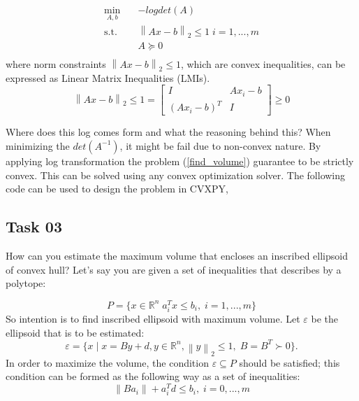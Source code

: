 \documentclass[12pt]{article}%
\begin{document}
\begin{equation}\label{find_volume}
\begin{aligned}
\min_{A,b} \quad & -log det(A)\\
\textrm{s.t.} \quad & \left \| Ax-b \right \|_2 \leq 1 \; i=1,...,m\\
  & A \succeq 0\\
\end{aligned}
\end{equation} where norm constraints $\left \| Ax-b \right \|_2 \leq 1 $, which are convex inequalities, can be expressed as Linear Matrix Inequalities (LMIs). 
\begin{equation}
    \left \| Ax-b \right \|_2 \leq 1  = \begin{bmatrix}
I & Ax_i-b\\ 
 (Ax_i-b)^T & I 
\end{bmatrix} \geq 0
\end{equation}

Where does this log comes form and what the reasoning behind this? When minimizing the $det(A^{-1})$, it might be fail due to non-convex nature. By applying log transformation the problem (\ref{find_volume}) guarantee to be strictly convex. This can be solved using any convex optimization solver. The following code can be used to design the problem in CVXPY,


\subsection{Task 03} 
How can you estimate the maximum volume that encloses an inscribed ellipsoid of convex hull?
Let's say you are given a set of inequalities that describes by a polytope:

\begin{equation}
    P = \{ x \in \mathbb{R}^n \; a_i^Tx \leq b_i, \; i=1,...,m\}
\end{equation} So intention is to find inscribed ellipsoid with maximum volume. Let $\varepsilon$ be the ellipsoid that is to be estimated: 
\begin{equation}
    \varepsilon = \{x \; | \; x = By + d, y \in \mathbb{R}^n, \left \| y \right \|_2 \leq 1, \; B= B^T \succ 0\}.
\end{equation} In order to maximize the volume, the condition $\varepsilon \subseteq P$ should be satisfied; this condition can be formed as the following way as a set of inequalities:
\begin{equation}
  \left \| Ba_i \right \| + a_i^Td \leq b_i, \; i=0,...,m
\end{equation}
\end{document}
